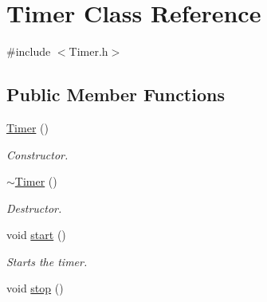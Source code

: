 \hypertarget{class_timer}{\section{Timer Class Reference}
\label{class_timer}
}


{\ttfamily \#include $<$Timer.\-h$>$}

\subsection*{Public Member Functions}
\begin{DoxyCompactItemize}
\item 
\hypertarget{class_timer_a5f16e8da27d2a5a5242dead46de05d97}{\hyperlink{class_timer_a5f16e8da27d2a5a5242dead46de05d97}{Timer} ()}\label{class_timer_a5f16e8da27d2a5a5242dead46de05d97}

\begin{DoxyCompactList}\small\item\em Constructor. \end{DoxyCompactList}\item 
\hypertarget{class_timer_a14fa469c4c295c5fa6e66a4ad1092146}{\hyperlink{class_timer_a14fa469c4c295c5fa6e66a4ad1092146}{$\sim$\-Timer} ()}\label{class_timer_a14fa469c4c295c5fa6e66a4ad1092146}

\begin{DoxyCompactList}\small\item\em Destructor. \end{DoxyCompactList}\item 
\hypertarget{class_timer_a3a8b5272198d029779dc9302a54305a8}{void \hyperlink{class_timer_a3a8b5272198d029779dc9302a54305a8}{start} ()}\label{class_timer_a3a8b5272198d029779dc9302a54305a8}

\begin{DoxyCompactList}\small\item\em Starts the timer. \end{DoxyCompactList}\item 
\hypertarget{class_timer_a63f0eb44b27402196590a03781515dba}{void \hyperlink{class_timer_a63f0eb44b27402196590a03781515dba}{stop} ()}\label{class_timer_a63f0eb44b27402196590a03781515dba}


\end{DoxyCompactItemize}
